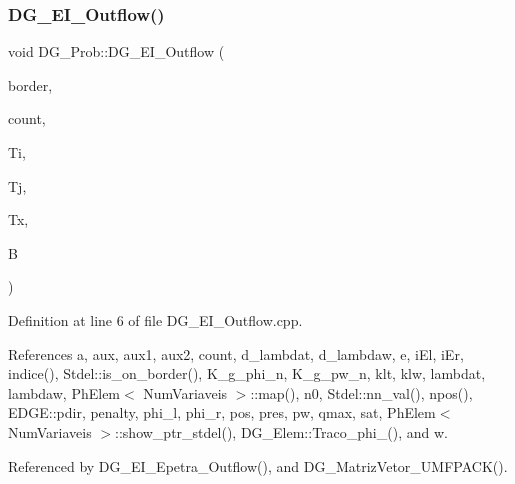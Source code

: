 \subsubsection{\texorpdfstring{D\+G\+\_\+\+E\+I\+\_\+\+Outflow()}{DG\_EI\_Outflow()}\hspace{0.1cm}{\footnotesize\ttfamily [1/2]}}
{\footnotesize\ttfamily void D\+G\+\_\+\+Prob\+::\+D\+G\+\_\+\+E\+I\+\_\+\+Outflow (\begin{DoxyParamCaption}\item[{const \hyperlink{structEDGE}{E\+D\+GE}}]{border,  }\item[{int \&}]{count,  }\item[{int $\ast$}]{Ti,  }\item[{int $\ast$}]{Tj,  }\item[{double $\ast$}]{Tx,  }\item[{double $\ast$}]{B }\end{DoxyParamCaption})}



Definition at line 6 of file D\+G\+\_\+\+E\+I\+\_\+\+Outflow.\+cpp.



References a, aux, aux1, aux2, count, d\+\_\+lambdat, d\+\_\+lambdaw, e, i\+El, i\+Er, indice(), Stdel\+::is\+\_\+on\+\_\+border(), K\+\_\+g\+\_\+phi\+\_\+n, K\+\_\+g\+\_\+pw\+\_\+n, klt, klw, lambdat, lambdaw, Ph\+Elem$<$ Num\+Variaveis $>$\+::map(), n0, Stdel\+::nn\+\_\+val(), npos(), E\+D\+G\+E\+::pdir, penalty, phi\+\_\+l, phi\+\_\+r, pos, pres, pw, qmax, sat, Ph\+Elem$<$ Num\+Variaveis $>$\+::show\+\_\+ptr\+\_\+stdel(), D\+G\+\_\+\+Elem\+::\+Traco\+\_\+phi\+\_(), and w.



Referenced by D\+G\+\_\+\+E\+I\+\_\+\+Epetra\+\_\+\+Outflow(), and D\+G\+\_\+\+Matriz\+Vetor\+\_\+\+U\+M\+F\+P\+A\+C\+K().

